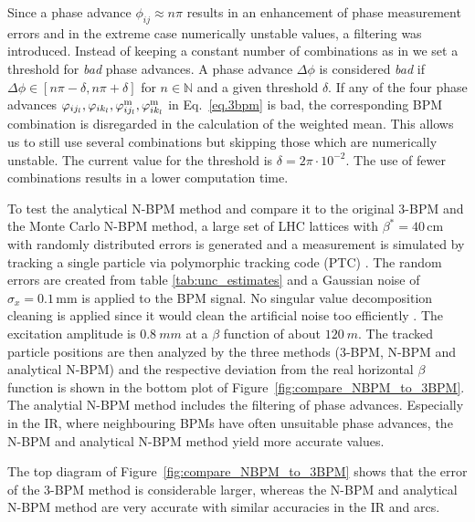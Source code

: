 Since a phase advance $ \phi_{ij} \approx n\pi $ results in an enhancement of phase measurement errors and in the extreme case numerically unstable values, a filtering was introduced. Instead of keeping a constant number of combinations as in \cite{nbpm} we set a threshold for \emph{bad} phase advances. A phase advance $ \Delta \phi $ is considered \emph{bad} if $ \Delta \phi \in [ n\pi - \delta, n\pi + \delta ] $ for $ n\in \mathbb{N} $ and a given threshold $ \delta $. If any of the four phase advances $ \varphi_{ij_l}, \varphi_{ik_l},\varphi_{ij_l}^\text{m},\varphi_{ik_l}^\text{m} $ in Eq.~\eqref{eq.3bpm} is bad, the corresponding BPM combination is disregarded in the calculation of the weighted mean. This allows us to still use several combinations but skipping those which are numerically unstable. The current value for the threshold is $ \delta = 2\pi \cdot 10^{-2}$. The use of fewer combinations results in a lower computation time. 


To test the analytical N-BPM method and compare it to the original 3-BPM and the Monte Carlo N-BPM method, a large set of LHC lattices with $ \beta^*=40\,\text{cm} $ with randomly distributed errors is generated and a measurement is simulated by tracking a single particle via polymorphic tracking code (PTC) \cite{Schmidt:573082}. The random errors are created from table \ref{tab:unc_estimates} and a Gaussian noise of $ \sigma_x = 0.1\,\text{mm} $ is applied to the BPM signal. No singular value decomposition cleaning is applied since it would clean the artificial noise too efficiently \cite{Langner:2016uiy}. The excitation amplitude is $\SI{0.8}{mm}$ at a $ \beta $ function of about $ \SI{120}{m} $. The tracked particle positions are then analyzed by the three methods (3-BPM, N-BPM and analytical N-BPM) and the respective deviation from the real horizontal $ \beta $ function is shown in the bottom plot of Figure~\ref{fig:compare_NBPM_to_3BPM}. The analytial N-BPM method includes the filtering of phase advances. Especially in the IR, where neighbouring BPMs have often unsuitable phase advances, the N-BPM and analytical N-BPM method yield more accurate values.

The top diagram of Figure~\ref{fig:compare_NBPM_to_3BPM} shows that the error of the 3-BPM method is considerable larger, whereas the N-BPM and analytical N-BPM method are very accurate with similar accuracies in the IR and arcs.


